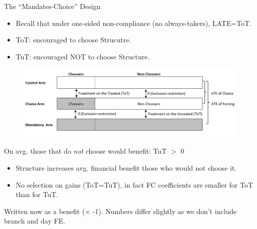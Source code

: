 \documentclass[9pt, aspectratio=169]{beamer}
\begin{document}
\begin{frame}{The ``Mandates-Choice'' Design}

\begin{itemize}
    \vfill \item Recall that under one-sided non-compliance (no always-takers), LATE=ToT.
    \vfill\item ToT: encouraged to choose Strucutre. 
 \vfill\item TuT: encouraged NOT to choose Structure. 
\end{itemize}
\begin{figure}[H]
    \begin{center}
        \centering
        \includegraphics[width=.8\textwidth]{Figuras/tot_tut_graph.png}
    \end{center}
\end{figure}   
 \vfill
\end{frame}




\begin{frame}{On avg. those that do \textit{not} choose would benefit: TuT $>$ 0}
\begin{itemize}
    \vfill \item Structure increases avg. financial benefit those who \alert{would not} choose it.
    \vfill \item  No selection on gains (ToT=TuT), in fact FC coefficients are smaller for ToT than for TuT.
\end{itemize}
\vspace{.1in}
\begin{table}[H]
\label{tot_tut}
\begin{center}
\small{}
\end{center}
\end{table}
\begin{center}
\vspace{-.1in}
\scriptsize{\centering Written now as a benefit ($\times$ -1). Numbers differ slightly as we don't include branch and day FE.}  
\end{center}
\end{frame}
\end{document}

